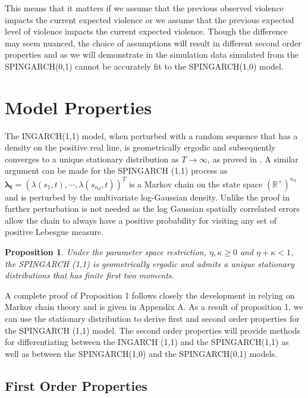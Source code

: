 \documentclass[11pt]{isuthesis}
\newtheorem{prop}{Proposition}
\begin{document}
This means that it matters if we assume that the previous observed violence impacts the current expected violence or we assume that the previous expected level of violence impacts the current expected violence.  Though the difference may seem nuanced, the choice of assumptions will result in different second order properties and as we will demonstrate in the simulation data simulated from the SPINGARCH(0,1) cannot be accurately fit to the SPINGARCH(1,0) model.


\section{Model Properties}

The INGARCH(1,1) model, when perturbed with a random sequence that has a density on the positive real line, is geometrically ergodic and subsequently converges to a unique stationary distribution as $T \to \infty$, as proved in \cite{fokianos2009poisson}.  A similar argument can be made for the SPINGARCH (1,1) process as $\boldsymbol{\lambda_t}=\left(\lambda(s_1,t),\cdots,\lambda(s_{n_d},t)\right)^T$ is a Markov chain on the state space $(\mathbb{R}^+)^{n_d}$ and is perturbed by the multivariate log-Gaussian density. Unlike the proof in \cite{fokianos2009poisson} further perturbation is not needed as the log Gaussian spatially correlated errors allow the chain to always have a positive probability for visiting any set of positive Lebesgue measure. 

\begin{prop} \label{Prop 1}
	Under the parameter space restriction, $\eta,\kappa\geq0$ and $\eta+\kappa<1$, the SPINGARCH (1,1) is geometrically ergodic and admits a unique stationary distributions that has finite first two moments.
\end{prop}
A complete proof of Proposition 1 follows closely the development in \cite{fokianos2009poisson} relying on Markov chain theory and is given in Appendix A.  As a result of proposition 1, we can use the stationary distribution to derive first and second order properties for the SPINGARCH (1,1) model.  The second order properties will provide methods for differentiating between the INGARCH (1,1) and the SPINGARCH(1,1) as well as between the SPINGARCH(1,0) and the SPINGARCH(0,1) models. 

\subsection{First Order Properties}
\end{document}
